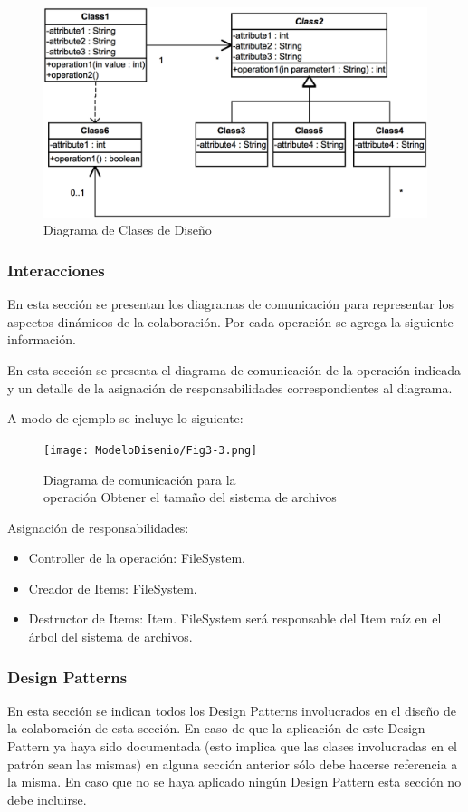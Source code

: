 \documentclass[10pt,spanish]{article}
\numberwithin{figure}{section} %
\newcounter{subsubsubsection}[subsubsection]
\begin{document}
\begin{siderules}
\begin{figure}[H]
\centering
\includegraphics[scale=0.42]{ModeloDisenio/Fig3-2.png}
\caption{Diagrama de Clases de Diseño}
\end{figure}

\subsubsection{Interacciones}
En esta sección se presentan los diagramas de comunicación para representar los aspectos dinámicos de la colaboración. Por cada operación se agrega la siguiente información.

En esta sección se presenta el diagrama de comunicación de la operación indicada y un detalle de la asignación de responsabilidades correspondientes al diagrama.

A modo de ejemplo se incluye lo siguiente:\\
\begin{figure}[H]
\centering
\texttt{[image: ModeloDisenio/Fig3-3.png]}
\captionsetup{justification=centering}
\caption{Diagrama de comunicación para la\\ operación Obtener el tamaño del sistema de archivos}
\end{figure}

Asignación de responsabilidades:
\begin{itemize}
\item Controller de la operación:  FileSystem.
\item Creador de Items:  FileSystem.
\item Destructor de Items:  Item.  FileSystem será responsable del Item raíz en el árbol del sistema de archivos.
\end{itemize}

\subsubsection{Design Patterns}
En esta sección se indican todos los Design Patterns involucrados en el diseño de la colaboración de esta sección. En caso de que la aplicación de este Design Pattern ya haya sido documentada (esto implica que las clases involucradas en el patrón sean las mismas) en alguna sección anterior sólo debe hacerse referencia a la misma. En caso que no se haya aplicado ningún Design Pattern esta sección no debe incluirse.


\end{siderules}
\end{document}
